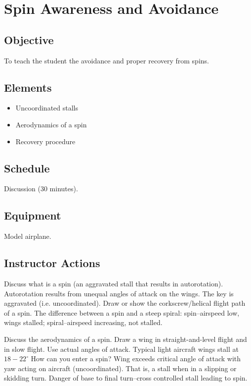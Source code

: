 \chapter{Spin Awareness and Avoidance}

\section{Objective}

To teach the student the avoidance and proper recovery from spins.

\section{Elements}

\begin{itemize}
  \item Uncoordinated stalls
  \item Aerodynamics of a spin
  \item Recovery procedure
\end{itemize}

\section{Schedule}

Discussion (30 minutes).

\section{Equipment}

Model airplane.

\section{Instructor Actions}

Discuss what is a spin (an aggravated stall that results in autorotation).
Autorotation results from unequal angles of attack on the wings. The key is
aggravated (i.e. uncoordinated). Draw or show the corkscrew/helical flight path
of a spin. The difference between a spin and a steep spiral: spin--airspeed low,
wings stalled; spiral--airspeed increasing, not stalled.

Discuss the aerodynamics of a spin. Draw a wing in straight-and-level flight
and in slow flight. Use actual angles of attack. Typical light aircraft wings
stall at $18-22^{\circ}$ How can you enter a spin? Wing exceeds critical angle
of attack with yaw acting on aircraft (uncoordinated). That is, a stall when in
a slipping or skidding turn. Danger of base to final turn--cross controlled
stall leading to spin.

